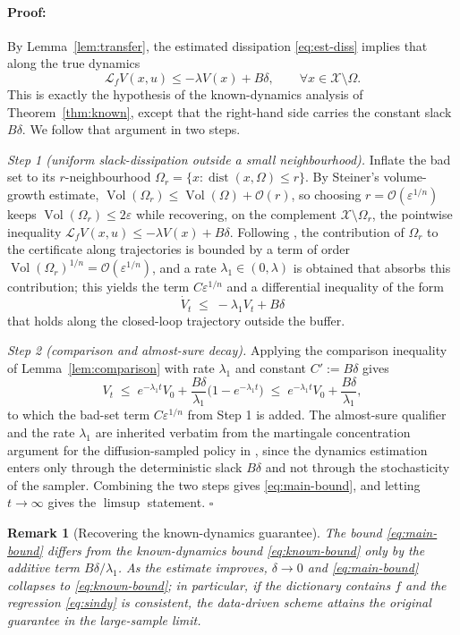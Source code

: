 \documentclass{article}
\newenvironment{proof}{\paragraph{Proof:}}{\hfill$\square$}
\newcommand{\eps}{\varepsilon}
\newcommand{\Lie}[2]{\mathcal{L}_{#1} #2}
\newcommand{\Vol}{\operatorname{Vol}}
\newtheorem{remark}[theorem]{Remark}
\begin{document}
\begin{proof}
By Lemma~\ref{lem:transfer}, the estimated dissipation \eqref{eq:est-diss}
implies that along the true dynamics
\[
    \Lie{f}{V}(x,u)\le -\lambda V(x)+B\delta,
    \qquad \forall x\in\mathcal{X}\setminus\Omega.
\]
This is exactly the hypothesis of the known-dynamics analysis of
Theorem~\ref{thm:known}, except that the right-hand side carries the constant
slack $B\delta$. We follow that argument in two steps.

\emph{Step 1 (uniform slack-dissipation outside a small neighbourhood).}
Inflate the bad set to its $r$-neighbourhood
$\Omega_r=\{x:\operatorname{dist}(x,\Omega)\le r\}$. By Steiner's volume-growth
estimate, $\Vol(\Omega_r)\le \Vol(\Omega)+\mathcal{O}(r)$, so choosing
$r=\mathcal{O}(\eps^{1/n})$ keeps $\Vol(\Omega_r)\le 2\eps$ while recovering, on the
complement $\mathcal{X}\setminus\Omega_r$, the pointwise inequality
$\Lie{f}{V}(x,u)\le -\lambda V(x)+B\delta$. Following \citet{cheng2026safe}, the
contribution of $\Omega_r$ to the certificate along trajectories is bounded by a
term of order $\Vol(\Omega_r)^{1/n}=\mathcal{O}(\eps^{1/n})$, and a rate
$\lambda_1\in(0,\lambda)$ is obtained that absorbs this contribution; this yields
the term $C\eps^{1/n}$ and a differential inequality of the form
\[
    \dot V_t \;\le\; -\lambda_1 V_t + B\delta
\]
that holds along the closed-loop trajectory outside the buffer.

\emph{Step 2 (comparison and almost-sure decay).}
Applying the comparison inequality of Lemma~\ref{lem:comparison} with rate
$\lambda_1$ and constant $C':=B\delta$ gives
\[
    V_t \;\le\; e^{-\lambda_1 t}V_0+\frac{B\delta}{\lambda_1}\bigl(1-e^{-\lambda_1 t}\bigr)
    \;\le\; e^{-\lambda_1 t}V_0+\frac{B\delta}{\lambda_1},
\]
to which the bad-set term $C\eps^{1/n}$ from Step 1 is added. The almost-sure
qualifier and the rate $\lambda_1$ are inherited verbatim from the martingale
concentration argument for the diffusion-sampled policy in
\citet{cheng2026safe}, since the dynamics estimation enters only through the
deterministic slack $B\delta$ and not through the stochasticity of the sampler.
Combining the two steps gives \eqref{eq:main-bound}, and letting $t\to\infty$
gives the $\limsup$ statement.
\end{proof}

\begin{remark}[Recovering the known-dynamics guarantee]
\label{rem:recover}
The bound \eqref{eq:main-bound} differs from the known-dynamics bound
\eqref{eq:known-bound} only by the additive term $B\delta/\lambda_1$. As the
estimate improves, $\delta\to 0$ and \eqref{eq:main-bound} collapses to
\eqref{eq:known-bound}; in particular, if the dictionary contains $f$ and the
regression \eqref{eq:sindy} is consistent, the data-driven scheme attains the
original guarantee in the large-sample limit.
\end{remark}
\end{document}
